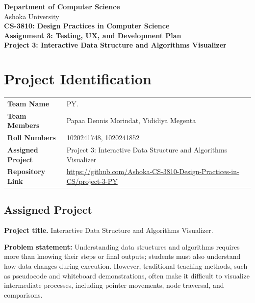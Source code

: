 \documentclass[11pt,a4paper]{article}
\renewcommand{\arraystretch}{1.06}
\begin{document}
\begin{center}
  {\large\bfseries Department of Computer Science}\\[2pt]
  {\small Ashoka University}\\[10pt]
  {\LARGE\bfseries CS-3810: Design Practices in Computer Science}\\[6pt]
  {\large\bfseries Assignment 3: Testing, UX, and Development Plan}\\[10pt]
  {\large\bfseries Project 3: Interactive Data Structure and Algorithms Visualizer}
\end{center}

\section{Project Identification}

\begin{center}
\renewcommand{\arraystretch}{1.25}
\begin{tabular}{@{}L{4.2cm}L{10.4cm}@{}}
\toprule
\textbf{Team Name} & PY. \\
\textbf{Team Members} & Papaa Dennis Morindat, Yididiya Megenta \\
\textbf{Roll Numbers} & 1020241748, 1020241852 \\
\textbf{Assigned Project} & Project 3: Interactive Data Structure and Algorithms Visualizer \\
\textbf{Repository Link} & \url{https://github.com/Ashoka-CS-3810-Design-Practices-in-CS/project-3-PY} \\
\bottomrule
\end{tabular}
\end{center}

\subsection{Assigned Project}

\noindent\textbf{Project title.} Interactive Data Structure and Algorithms Visualizer.

\medskip
\noindent\textbf{Problem statement:} Understanding data structures and algorithms requires more than knowing their steps or final outputs; students must also understand how data changes during execution. However, traditional teaching methods, such as pseudocode and whiteboard demonstrations, often make it difficult to visualize intermediate processes, including pointer movements, node traversal, and comparisons. 
\end{document}
